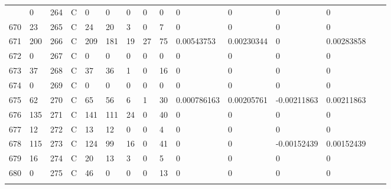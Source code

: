 \begin{longtable}{lllllllllllllll}
\begin{comment}
	669 & 0                 & 264 & C   & 0                 & 0                 & 0                 & 0    & 0          & 0              & 0              & 0             & 0            \\
	670 & 23                & 265 & C   & 24                & 20                & 3                 & 0    & 7          & 0              & 0              & 0             & 0            \\
	671 & 200               & 266 & C   & 209               & 181               & 19                & 27   & 75         & 0.00543753     & 0.00230344     & 0             & 0.00283858   \\
	672 & 0                 & 267 & C   & 0                 & 0                 & 0                 & 0    & 0          & 0              & 0              & 0             & 0            \\
	673 & 37                & 268 & C   & 37                & 36                & 1                 & 0    & 16         & 0              & 0              & 0             & 0            \\
	674 & 0                 & 269 & C   & 0                 & 0                 & 0                 & 0    & 0          & 0              & 0              & 0             & 0            \\
	675 & 62                & 270 & C   & 65                & 56                & 6                 & 1    & 30         & 0.000786163    & 0.00205761     & -0.00211863   & 0.00211863   \\
	676 & 135               & 271 & C   & 141               & 111               & 24                & 0    & 40         & 0              & 0              & 0             & 0            \\
	677 & 12                & 272 & C   & 13                & 12                & 0                 & 0    & 4          & 0              & 0              & 0             & 0            \\
	678 & 115               & 273 & C   & 124               & 99                & 16                & 0    & 41         & 0              & 0              & -0.00152439   & 0.00152439   \\
	679 & 16                & 274 & C   & 20                & 13                & 3                 & 0    & 5          & 0              & 0              & 0             & 0            \\
	680 & 0                 & 275 & C   & 46                & 0                 & 0                 & 0    & 13         & 0              & 0              & 0             & 0            \\

\end{comment}
\end{longtable}
